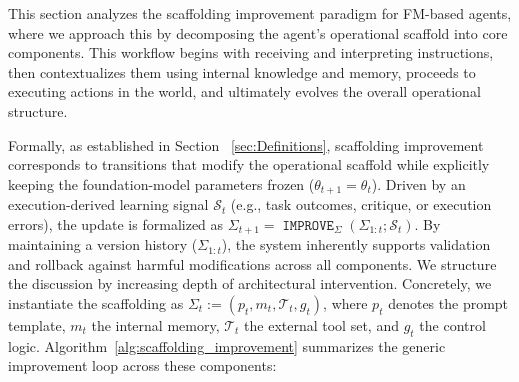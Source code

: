 \documentclass{article}
\newcommand{\IMPROVE}{\operatorname{\mathtt{IMPROVE}}}
\begin{document}
This section analyzes the scaffolding improvement paradigm for FM-based agents, where we approach this by decomposing the agent's operational scaffold into core components. This workflow begins with receiving and interpreting instructions, then contextualizes them using internal knowledge and memory, proceeds to executing actions in the world, and ultimately evolves the overall operational structure. 

Formally, as established in Section ~\ref{sec:Definitions}, scaffolding improvement corresponds to transitions that modify the operational scaffold while explicitly keeping the foundation-model parameters frozen ($\theta_{t+1}=\theta_{t}$). Driven by an execution-derived learning signal $\mathcal{S}_{t}$ (e.g., task outcomes, critique, or execution errors), the update is formalized as $\Sigma_{t+1}=\IMPROVE_{\Sigma}(\Sigma_{1:t};\mathcal{S}_{t})$. By maintaining a version history ($\Sigma_{1:t}$), the system inherently supports validation and rollback against harmful modifications across all components. We structure the discussion by increasing depth of architectural intervention. Concretely, we instantiate the scaffolding as $\Sigma_{t}:=(p_{t},m_{t},\mathcal{T}_{t},g_{t})$, where $p_{t}$ denotes the prompt template, $m_{t}$ the internal memory, $\mathcal{T}_{t}$ the external tool set, and $g_{t}$ the control logic. Algorithm~\ref{alg:scaffolding_improvement} summarizes the generic improvement loop across these components:
\end{document}
